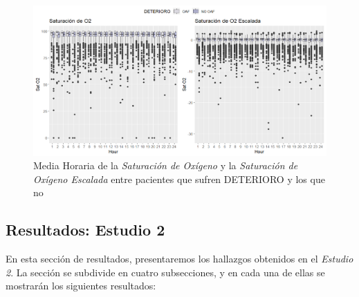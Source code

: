 \newpage
\thispagestyle{empty}
\begin{landscape}
\begin{figure}[H]
    \centering
    \includegraphics[scale = 0.68]{./img/satO2-boxplot-mean.png}
    \caption{Media Horaria de la \textit{Saturación de Oxígeno} y la \textit{Saturación de Oxígeno Escalada} entre pacientes que sufren DETERIORO y los que no}
    \label{fig:satO2-boxplot-mean}
\end{figure}
\end{landscape}
\restoregeometry


\subsection{Resultados: Estudio 2}\label{sec:resultados-estudio-1}

En esta sección de resultados, presentaremos los hallazgos obtenidos en el \textit{Estudio 2}. La sección se subdivide en cuatro subsecciones, y en cada una de ellas se mostrarán los siguientes resultados:


